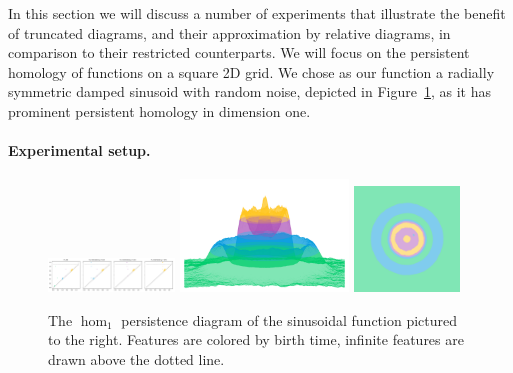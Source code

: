 
In this section we will discuss a number of experiments that illustrate the benefit of truncated diagrams, and their approximation by relative diagrams, in comparison to their restricted counterparts.
We will focus on the persistent homology of functions on a square 2D grid.
We chose as our function a radially symmetric damped sinusoid with random noise, depicted in Figure~\ref{fig:ripple1}, as it has prominent persistent homology in dimension one.

\paragraph*{Experimental setup.}

\begin{figure}[htbp]
  \centering
  \includegraphics[trim=0 0 790 0, clip, width=0.3\textwidth]{figures/matching2/full-dgm.pdf}
  \includegraphics[trim=-350 -800 -700 -300, clip, width=0.4\textwidth]{figures/matching2/full-surf_side-lowres.png}
  \includegraphics[trim=0 -800 0 0, width=0.25\textwidth]{figures/matching2/full-surf_top-lowres.png}
  \caption{The $\hom_1$ persistence diagram of the sinusoidal function pictured to the right.
  Features are colored by birth time, infinite features are drawn above the dotted line.}\label{fig:ripple1}
\end{figure}

